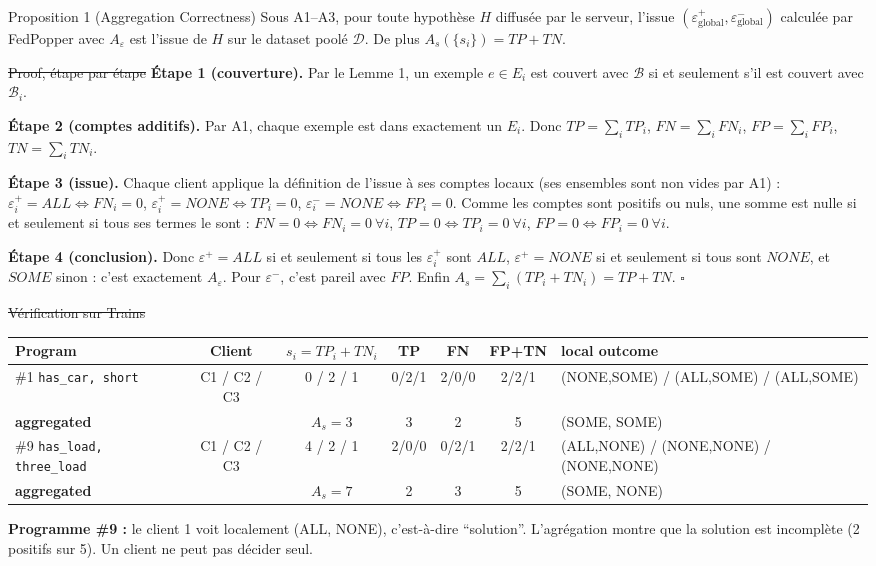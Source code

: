 \documentclass[10pt]{article}
\begin{document}
\begin{enonce}{Proposition 1 (Aggregation Correctness)}
Sous A1--A3, pour toute hypothèse $H$ diffusée par le serveur, l'issue $(\varepsilon^+_{\mathrm{global}},\varepsilon^-_{\mathrm{global}})$ calculée
par FedPopper avec $A_\varepsilon$ est l'issue de $H$ sur le dataset poolé $\mathcal{D}$. De plus $A_s(\{s_i\})=TP+TN$.
\end{enonce}

\st{Proof, étape par étape}
\textbf{Étape 1 (couverture).} Par le Lemme 1, un exemple $e\in E_i$ est couvert avec $\mathcal{B}$ si et seulement s'il est couvert avec $\mathcal{B}_i$.

\textbf{Étape 2 (comptes additifs).} Par A1, chaque exemple est dans exactement un $E_i$. Donc
$TP=\sum_iTP_i$, $FN=\sum_iFN_i$, $FP=\sum_iFP_i$, $TN=\sum_iTN_i$.

\textbf{Étape 3 (issue).} Chaque client applique la définition de l'issue à ses comptes locaux (ses ensembles sont non vides par A1) :
$\varepsilon_i^+=\mathit{ALL}\iff FN_i=0$, $\varepsilon_i^+=\mathit{NONE}\iff TP_i=0$, $\varepsilon_i^-=\mathit{NONE}\iff FP_i=0$.
Comme les comptes sont positifs ou nuls, une somme est nulle si et seulement si tous ses termes le sont :
$FN=0\iff FN_i=0\ \forall i$, $TP=0\iff TP_i=0\ \forall i$, $FP=0\iff FP_i=0\ \forall i$.

\textbf{Étape 4 (conclusion).} Donc $\varepsilon^+=\mathit{ALL}$ si et seulement si tous les $\varepsilon_i^+$ sont $\mathit{ALL}$, $\varepsilon^+=\mathit{NONE}$ si et seulement si tous sont $\mathit{NONE}$,
et $\mathit{SOME}$ sinon : c'est exactement $A_\varepsilon$. Pour $\varepsilon^-$, c'est pareil avec $FP$. Enfin
$A_s=\sum_i(TP_i+TN_i)=TP+TN$. \hfill $\square$

\st{Vérification sur Trains}
\begin{tabular}{@{}l c c c c c l@{}}
\textbf{Program} & \textbf{Client} & $s_i=TP_i+TN_i$ & TP & FN & FP+TN & \textbf{local outcome}\\\hline
\#1 \texttt{has\_car, short} & C1 / C2 / C3 & 0 / 2 / 1 & 0/2/1 & 2/0/0 & 2/2/1 & (NONE,SOME) / (ALL,SOME) / (ALL,SOME)\\
\textbf{aggregated} & & $A_s=3$ & 3 & 2 & 5 & (SOME, SOME)\\\hline
\#9 \texttt{has\_load, three\_load} & C1 / C2 / C3 & 4 / 2 / 1 & 2/0/0 & 0/2/1 & 2/2/1 & (ALL,NONE) / (NONE,NONE) / (NONE,NONE)\\
\textbf{aggregated} & & $A_s=7$ & 2 & 3 & 5 & (SOME, NONE)\\
\end{tabular}
\begin{piege}
\textbf{Programme \#9 :} le client 1 voit localement (ALL, NONE), c'est-à-dire ``solution''. L'agrégation montre que la solution est incomplète
(2 positifs sur 5). Un client ne peut pas décider seul.
\end{piege}
\end{document}
